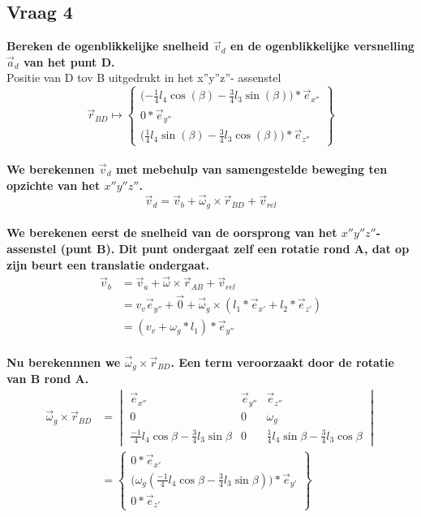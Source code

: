 \documentclass[a4paper,10pt]{article}
\begin{document}
\subsection{Vraag 4}
\textbf{Bereken de ogenblikkelijke snelheid $\vec{v}_d$ en de ogenblikkelijke versnelling $\vec{a}_d$ van het punt D.}\\
Positie van D tov B uitgedrukt in het x''y''z''- assenstel\\
\begin{equation}
	\vec{r}_{BD} \mapsto \begin{Bmatrix}
	\Big({-\frac{1}{4}} l_4 \cos(\beta)-\frac{3}{4} l_3 \sin(\beta)\Big)*\vec{e}_{x''}\\
	0 * \vec{e}_{y''}\\
	\Big (\frac{1}{4} l_4 \sin(\beta) - \frac{3}{4} l_3 \cos(\beta)\Big) * \vec{e}_{z''}
	\end{Bmatrix}
\end{equation}\\
\textbf{We berekennen $\vec{v}_d$ met mebehulp van samengestelde beweging ten opzichte van het $x''y''z''$.}\\
\begin{equation}
\label{vd}
\vec{v}_d = \vec{v}_b + \vec{\omega}_g \times \vec{r}_{BD}  +\vec{v}_{rel}
\end{equation}\\
\textbf{We berekenen eerst de snelheid van de oorsprong van het $x''y''z''$-assenstel (punt B). Dit punt ondergaat zelf een rotatie rond A, dat op zijn beurt een translatie ondergaat.}\\
\begin{equation}
\label{vb}
\begin{aligned}
\vec{v}_b &= \vec{v}_a + \vec{\omega}\times\vec{r}_{AB} + \vec{v}_{rel}\\
&= v_v  \vec{e}_{y''} + \vec{0} + \vec{\omega}_g \times (l_1 *\vec{e}_{x'} + l_2 * \vec{e}_{z'})\\
&= (v_v + \omega_g * l_1)*\vec{e}_{y''}
\end{aligned}
\end{equation}\\
\textbf{Nu berekennnen we $\vec{\omega}_g \times \vec{r}_{BD}$. Een term veroorzaakt door de rotatie van B rond A. }
\begin{equation}
\label{wrd}
\begin{aligned}
\vec{\omega}_g \times \vec{r}_{BD} & = \begin{vmatrix}
\vec{e}_{x''}& \vec{e}_{y''} & \vec{e}_{z''}\\
0 & 0 & \omega_g \\
\frac{-1}{4} l_4 \cos{\beta} - \frac{3}{4} l_3  \sin{\beta} & 0 &\frac{1}{4} l_4  \sin{\beta}-\frac{3}{4} l_3  \cos{\beta}
\end{vmatrix}\\
&= \begin{Bmatrix}
0 *\vec{e}_{x'}\\
\Big(\omega_g (\frac{-1}{4} l_4 \cos{\beta}-\frac{3}{4} l_3 \sin{\beta})\Big)*\vec{e}_{y'}\\
0 * \vec{e}_{z'}
\end{Bmatrix}
\end{aligned}
\end{equation}\\
\end{document}
